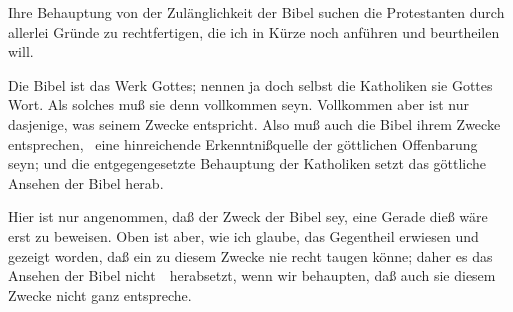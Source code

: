 Ihre Behauptung von der Zulänglichkeit der Bibel suchen die Protestanten durch allerlei Gründe zu rechtfertigen, die ich in Kürze noch anführen und beurtheilen will.
\begin{aufza}
\item {} Die Bibel ist das Werk Gottes; nennen ja doch selbst die Katholiken sie Gottes Wort. Als solches muß sie denn vollkommen seyn. Vollkommen aber ist nur dasjenige, was seinem Zwecke entspricht. Also muß auch die Bibel ihrem Zwecke entsprechen, \dh\ eine hinreichende Erkenntnißquelle der göttlichen Offenbarung seyn; und die entgegengesetzte Behauptung der Katholiken setzt das göttliche Ansehen der Bibel herab.
\item[\RWbet{Widerlegung.}] Hier ist nur  angenommen, daß der Zweck der Bibel sey, eine  Gerade dieß wäre erst zu beweisen. Oben ist aber, wie ich glaube, das Gegentheil erwiesen und gezeigt worden, daß ein  zu diesem Zwecke nie recht taugen könne; daher es das Ansehen der Bibel nicht~\ herabsetzt, wenn wir behaupten, daß auch sie diesem Zwecke nicht ganz entspreche.

\end{aufza}
